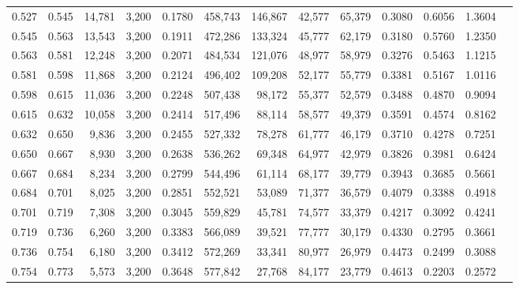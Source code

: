 \begin{tabular}{rrrrrrrrrrrrr}
0.527 & 0.545 & 14,781 & 3,200 &                                     0.1780 & 458,743 & 146,867 &  42,577 &  65,379 & 0.3080 & 0.6056 & 1.3604 \\
0.545 & 0.563 & 13,543 & 3,200 &                                     0.1911 & 472,286 & 133,324 &  45,777 &  62,179 & 0.3180 & 0.5760 & 1.2350 \\
0.563 & 0.581 & 12,248 & 3,200 &                                     0.2071 & 484,534 & 121,076 &  48,977 &  58,979 & 0.3276 & 0.5463 & 1.1215 \\
0.581 & 0.598 & 11,868 & 3,200 &                                     0.2124 & 496,402 & 109,208 &  52,177 &  55,779 & 0.3381 & 0.5167 & 1.0116 \\
0.598 & 0.615 & 11,036 & 3,200 &                                     0.2248 & 507,438 &  98,172 &  55,377 &  52,579 & 0.3488 & 0.4870 & 0.9094 \\
0.615 & 0.632 & 10,058 & 3,200 &                                     0.2414 & 517,496 &  88,114 &  58,577 &  49,379 & 0.3591 & 0.4574 & 0.8162 \\
0.632 & 0.650 &  9,836 & 3,200 &                                     0.2455 & 527,332 &  78,278 &  61,777 &  46,179 & 0.3710 & 0.4278 & 0.7251 \\
0.650 & 0.667 &  8,930 & 3,200 &                                     0.2638 & 536,262 &  69,348 &  64,977 &  42,979 & 0.3826 & 0.3981 & 0.6424 \\
0.667 & 0.684 &  8,234 & 3,200 &                                     0.2799 & 544,496 &  61,114 &  68,177 &  39,779 & 0.3943 & 0.3685 & 0.5661 \\
0.684 & 0.701 &  8,025 & 3,200 &                                     0.2851 & 552,521 &  53,089 &  71,377 &  36,579 & 0.4079 & 0.3388 & 0.4918 \\
0.701 & 0.719 &  7,308 & 3,200 &                                     0.3045 & 559,829 &  45,781 &  74,577 &  33,379 & 0.4217 & 0.3092 & 0.4241 \\
0.719 & 0.736 &  6,260 & 3,200 &                                     0.3383 & 566,089 &  39,521 &  77,777 &  30,179 & 0.4330 & 0.2795 & 0.3661 \\
0.736 & 0.754 &  6,180 & 3,200 &                                     0.3412 & 572,269 &  33,341 &  80,977 &  26,979 & 0.4473 & 0.2499 & 0.3088 \\
0.754 & 0.773 &  5,573 & 3,200 &                                     0.3648 & 577,842 &  27,768 &  84,177 &  23,779 & 0.4613 & 0.2203 & 0.2572 \\

\end{tabular}
